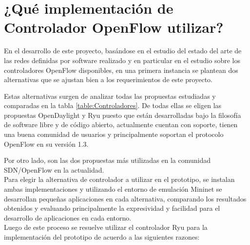 \section[¿Qu\'e implementaci\'on de Controlador OpenFlow utilizar?]{¿Qu\'e implementaci\'on de Controlador OpenFlow utilizar?}
En el desarrollo de este proyecto, basándose en el estudio del estado del arte de las redes definidas por software realizado y en particular en el estudio sobre los controladores OpenFlow disponibles, en una primera instancia se plantean dos alternativas que se ajustan bien a los requerimientos de este proyecto.

Estas alternativas surgen de analizar todas las propuestas estudiadas y comparadas en la tabla \ref{table:Controladores}. De todas ellas se eligen las propuestas OpenDaylight y Ryu puesto que est\'an desarrolladas bajo la filosofía de software libre y de código abierto, actualmente cuentan con soporte, tienen una buena comunidad de usuarios y principalmente soportan el protocolo OpenFlow en su versi\'on 1.3. 

Por otro lado, son las dos propuestas m\'as utilizadas en la comunidad SDN/OpenFlow en la actualidad.\\

Para elegir la alternativa de controlador a utilizar en el prototipo, se instalan ambas implementaciones y utilizando el entorno de emulación Mininet se desarrollan pequeñas aplicaciones en cada alternativa, comparando los resultados obtenidos y evaluando principalmente la expresividad y facilidad para el desarrollo de aplicaciones en cada entorno.\\

Luego de este proceso se resuelve utilizar el controlador Ryu para la implementaci\'on del prototipo de acuerdo a las siguientes razones:

